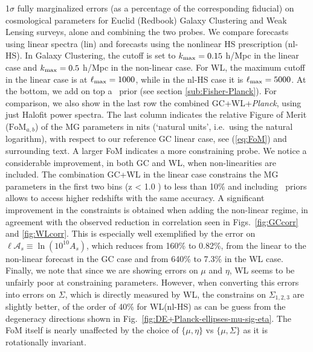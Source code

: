 \begin{table}
{1$\sigma$
fully marginalized errors (as a percentage of the corresponding fiducial) on cosmological parameters for Euclid (Redbook) Galaxy Clustering and Weak Lensing surveys, alone and combining the two probes. We compare forecasts using linear spectra (lin) and forecasts using the nonlinear HS prescription (nl-HS). In Galaxy Clustering, the cutoff is set to $k_{\rm max}=0.15$ h/Mpc in the linear case and $k_{\rm max}=0.5$ h/Mpc in the non-linear case.
For WL, the maximum cutoff in the linear case is at $\ell_{\rm max} = 1000$, 
while in the nl-HS case it is $\ell_{\rm max} = 5000$.
At the bottom, we add on top a \planck\ prior (see section \ref{sub:Fisher-Planck}).
For comparison, we also show in the last row the combined GC+WL+{\it Planck}, using just Halofit power spectra. 
The last column indicates the relative Figure of Merit ($\text{FoM}_{a,b}$) of the MG parameters in nits (`natural units', i.e.\ using the natural logarithm), with respect to our reference GC linear case, see (\ref{eq:FoM}) and surrounding text. A larger FoM indicates a more constraining probe. We notice a considerable improvement, in both GC and WL, when non-linearities are included.
The combination GC+WL in the linear case 
constrains the MG parameters in the first two bins (z < 1.0 ) to less than 10$\%$ and including \planck\ priors allows to access higher redshifts with the same accuracy. A significant improvement in the constraints is obtained when adding the non-linear regime, in agreement with the observed reduction in correlation seen in Figs.\ \ref{fig:GCcorr} and \ref{fig:WLcorr}. This is especially well exemplified by the error on $\ell \mathcal{A}_s \equiv \ln(10^{10} A_{s})$, which reduces from 160\%  to 0.82\%, from the linear to the non-linear forecast in the GC case
and from 640\%  to 7.3\% in the WL case. 
Finally, we note that since we are showing errors on $\mu$ and $\eta$, WL seems to be unfairly poor at constraining parameters. However, when converting this errors into errors on $\Sigma$, which is directly measured by WL, the constrains on $\Sigma_{1,2,3}$ are slightly better, of the order of 40\% for WL(nl-HS) as can be guess from the degeneracy directions shown in Fig.\ \ref{fig:DE+Planck-ellipses-mu-sig-eta}. The FoM itself is nearly unaffected by the choice of $\{\mu,\eta\}$ vs $\{\mu,\Sigma\}$ as it is rotationally invariant.
}
\end{table}
\normalsize

%

